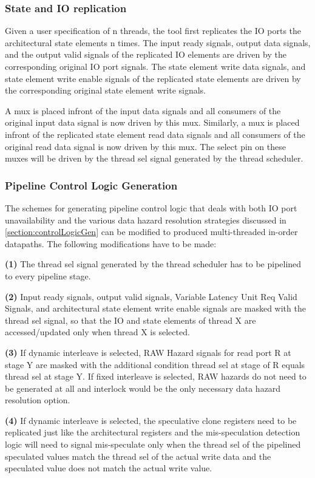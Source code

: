 \subsubsection{State and IO replication}
\label{sec:replication}
Given a user specification of n threads, the tool first replicates the IO ports the architectural state elements n times. The input ready signals, output data signals, and the output valid signals of the replicated IO elements are driven by the corresponding original IO port signals. The state element write data signals, and state element write enable signals of the replicated state elements are driven by the corresponding original state element write signals. 

A mux is placed infront of the input data signals and all consumers of the original input data signal is now driven by this mux. Similarly, a mux is placed infront of the replicated state element read data signals and all consumers of the original read data signal is now driven by this mux. The select pin on these muxes will be driven by the thread sel signal generated by the thread scheduler.

\subsubsection{Pipeline Control Logic Generation}
The schemes for generating pipeline control logic that deals with both IO port unavailability and the various data hazard resolution strategies discussed in \ref{section:controlLogicGen} can be modified to produced multi-threaded in-order datapaths. The following modifications have to be made:

{\bf (1)} The thread sel signal generated by the thread scheduler has to be pipelined to every pipeline stage.

{\bf (2)} Input ready signals, output valid signals, Variable Latency Unit Req Valid Signals, and architectural state element write enable signals are masked with the thread sel signal, so that the IO and state elements of thread X are accessed/updated only when thread X is selected.

{\bf (3)} If dynamic interleave is selected, RAW Hazard signals for read port R at stage Y are masked with the additional condition thread sel at stage of R equals thread sel at stage Y. If fixed interleave is selected, RAW hazards do not need to be generated at all and interlock would be the only necessary data hazard resolution option.

{\bf (4)} If dynamic interleave is selected, the speculative clone registers need to be replicated just like the architectural registers and the mis-speculation detection logic will need to signal mis-speculate only when the thread sel of the pipelined speculated values match the thread sel of the actual write data and the speculated value does not match the actual write value.

